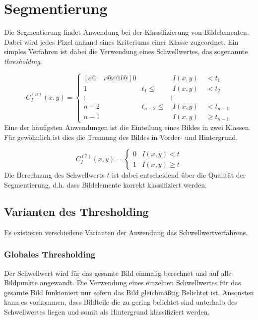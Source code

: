 \section{Segmentierung}
\writtenby{\dcauthornameewie}%
Die Segmentierung findet Anwendung bei der Klassifizierung von Bildelementen.
Dabei wird jedes Pixel anhand eines Kriteriums einer Klasse zugeordnet.
Ein simples Verfahren ist dabei die Verwendung eines Schwellwertes, das sogenannte \emph{thresholding}.

  \[ C_I^{(n)}(x,y) = \begin{cases}[c@{\quad}r@{}c@{}l@{}]
       0      &              & \;I(x,y) & \;<    t_1     \\
       1      & t_1     \leq & \;I(x,y) & \;<    t_2     \\
       \vdots &              &   \vdots &                \\
       n-2    & t_{n-2} \leq & \;I(x,y) & \;<    t_{n-1} \\
       n-1    &              & \;I(x,y) & \;\geq t_{n-1}
     \end{cases} \]
%
Eine der häufigsten Anwendungen ist die Einteilung eines Bildes in zwei Klassen.
Für gewöhnlich ist dies die Trennung des Bildes in Vorder- und Hintergrund.

  \[ C_I^{(2)}(x,y) = \begin{cases}
       0 & I(x,y) <    t \\
       1 & I(x,y) \geq t
     \end{cases} \]
%
Die Berechnung des Schwellwerts $t$ ist dabei entscheidend über die Qualität der Segmentierung, d.h. dass Bildelemente korrekt klassifiziert werden.

\subsection*{Varianten des Thresholding}
Es existieren verschiedene Varianten der Anwendung das Schwellwertverfahrens.


\subsubsection*{Globales Thresholding}
Der Schwellwert wird für das gesamte Bild einmalig berechnet und auf alle Bildpunkte angewandt.
Die Verwendung eines einzelnen Schwellwertes für das gesamte Bild funkioniert nur sofern das Bild gleichmäßtig Belichtet ist.
Ansonsten kann es vorkommen, dass Bildteile die zu gering belichtet sind unterhalb des Schwellwertes liegen und somit als Hintergrund klassifiziert werden.

